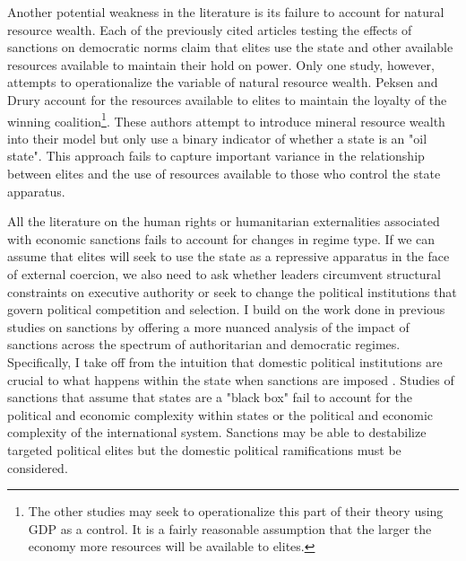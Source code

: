 \documentclass[a4paper]{article}\usepackage[]{graphicx}\usepackage[]{color}
\begin{document}
\par
Another potential weakness in the literature is its failure to account for natural resource wealth. Each of the previously cited articles testing the effects of sanctions on democratic norms claim that elites use the state and other available resources available to maintain their hold on power. Only one study, however, attempts to operationalize the variable of natural resource wealth. Peksen and Drury \citet{peksen2010coercive} account for the resources available to elites to maintain the loyalty of the winning coalition\footnote{The other studies may seek to operationalize this part of their theory using GDP as a control. It is a fairly reasonable assumption that the larger the economy more resources will be available to elites.}. These authors attempt to introduce mineral resource wealth into their model but only use a binary indicator of whether a state is an "oil state". This approach fails to capture important variance in the relationship between elites and the use of resources available to those who control the state apparatus.  
\par
All the literature on the human rights or humanitarian externalities associated with economic sanctions fails to account for changes in regime type. If we can assume that elites will seek to use the state as a repressive apparatus in the face of external coercion, we also need to ask whether leaders circumvent structural constraints on executive authority or seek to change the political institutions that govern political competition and selection. I build on the work done in previous studies on sanctions by offering a more nuanced analysis of the impact of sanctions across the spectrum of authoritarian and democratic regimes. Specifically, I take off from the intuition that domestic political institutions are crucial to what happens within the state when sanctions are imposed \citep{allen2008domestic}. Studies of sanctions that assume that states are a "black box" fail to account for the political and economic complexity within states or the political and economic complexity of the international system. Sanctions may be able to destabilize targeted political elites \citep{marinov2005economic} but the domestic political ramifications must be considered.  
\end{document}
